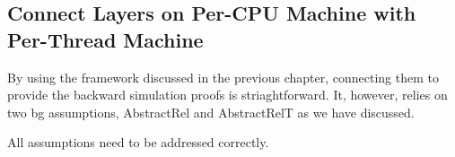 \subsection{Connect Layers on Per-CPU Machine with Per-Thread Machine}
\label{chapter:certikos:subsec:multithreaded-connect}

By using the framework discussed in the previous chapter, connecting them to provide the backward simulation proofs is striaghtforward.
It, however, relies on two bg assumptions, 
AbstractRel and AbstractRelT as we have discussed. 

All assumptions need to be addressed correctly.